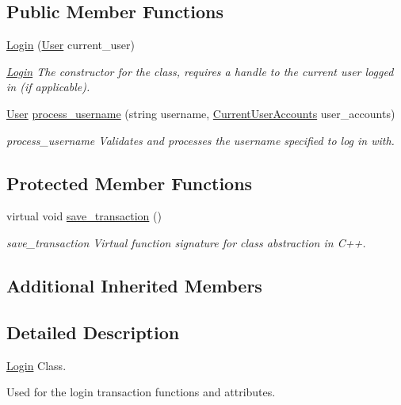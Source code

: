 \subsection*{Public Member Functions}
\begin{DoxyCompactItemize}
\item 
\hyperlink{class_login_a57323a0401a0d1d62b5fbd8da29d8df5}{Login} (\hyperlink{class_user}{User} current\-\_\-user)
\begin{DoxyCompactList}\small\item\em \hyperlink{class_login}{Login} The constructor for the class, requires a handle to the current user logged in (if applicable). \end{DoxyCompactList}\item 
\hyperlink{class_user}{User} \hyperlink{class_login_a1df0700504a3c9f7f9def1a9591f078e}{process\-\_\-username} (string username, \hyperlink{class_current_user_accounts}{Current\-User\-Accounts} user\-\_\-accounts)
\begin{DoxyCompactList}\small\item\em process\-\_\-username Validates and processes the username specified to log in with. \end{DoxyCompactList}\end{DoxyCompactItemize}
\subsection*{Protected Member Functions}
\begin{DoxyCompactItemize}
\item 
virtual void \hyperlink{class_login_a8e5996ad33eb07eef44f55deba6c298e}{save\-\_\-transaction} ()
\begin{DoxyCompactList}\small\item\em save\-\_\-transaction Virtual function signature for class abstraction in C++. \end{DoxyCompactList}\end{DoxyCompactItemize}
\subsection*{Additional Inherited Members}


\subsection{Detailed Description}
\hyperlink{class_login}{Login} Class. 

Used for the login transaction functions and attributes. 

